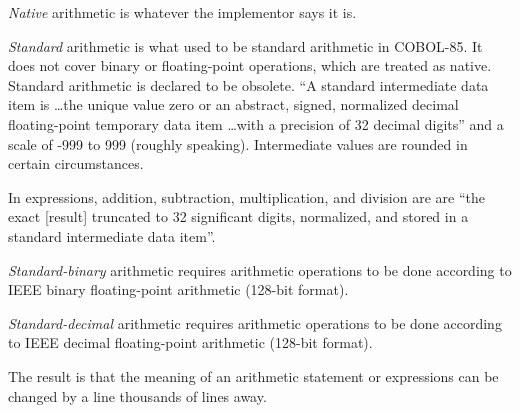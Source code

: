 \documentclass{article}
\begin{document}
{\it Native} arithmetic is whatever the implementor says it is.

{\it Standard} arithmetic is what used to be standard arithmetic in
COBOL-85.  It does not cover binary or floating-point operations,
which are treated as native.  Standard arithmetic is declared to
be obsolete.  ``A standard intermediate data item is \dots the
unique value zero or an abstract, signed, normalized decimal
floating-point temporary data item \dots with a precision of
32 decimal digits'' and a scale of -999 to 999 (roughly speaking).
Intermediate values are rounded in certain circumstances.

In expressions,
addition, subtraction, multiplication, and
division are are ``the exact [result] truncated
to 32 significant digits, normalized, and stored in a standard
intermediate data item''.

{\it Standard-binary} arithmetic requires arithmetic operations
to be done according to IEEE binary floating-point
arithmetic (128-bit format).

{\it Standard-decimal} arithmetic requires arithmetic operations
to be done according to IEEE decimal floating-point arithmetic
(128-bit format).

The result is that the meaning of an arithmetic statement or
expressions can be changed by a line thousands of lines away.
\end{document}
